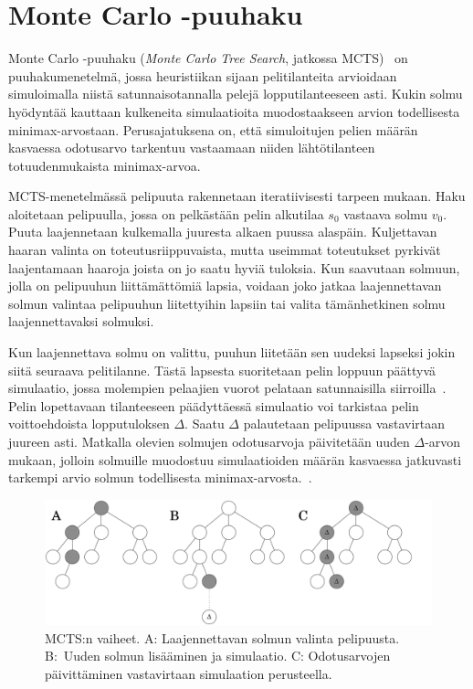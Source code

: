 \documentclass[12pt,finnish]{tktltiki2}
\theoremstyle{definition}
\theoremstyle{remark}
\begin{document}
\section{Monte Carlo -puuhaku}

Monte Carlo -puuhaku (\textit{Monte Carlo Tree Search}, jatkossa MCTS)~\cite{browne} on puuhakumenetelmä, jossa heuristiikan sijaan pelitilanteita arvioidaan simuloimalla niistä satunnaisotannalla pelejä lopputilanteeseen asti. Kukin solmu hyödyntää kauttaan kulkeneita simulaatioita muodostaakseen arvion todellisesta minimax-arvostaan. Perusajatuksena on, että simuloitujen pelien määrän kasvaessa odotusarvo tarkentuu vastaamaan niiden lähtötilanteen totuudenmukaista minimax-arvoa.

MCTS-menetelmässä pelipuuta rakennetaan iteratiivisesti tarpeen mukaan. Haku aloitetaan pelipuulla, jossa on pelkästään pelin alkutilaa $s_0$ vastaava solmu $v_0$. Puuta laajennetaan kulkemalla juuresta alkaen puussa alaspäin. Kuljettavan haaran valinta on toteutusriippuvaista, mutta useimmat toteutukset pyrkivät laajentamaan haaroja joista on jo saatu hyviä tuloksia. Kun saavutaan solmuun, jolla on pelipuuhun liittämättömiä lapsia, voidaan joko jatkaa laajennettavan solmun valintaa pelipuuhun liitettyihin lapsiin tai valita tämänhetkinen solmu laajennettavaksi solmuksi.

Kun laajennettava solmu on valittu, puuhun liitetään sen uudeksi lapseksi jokin siitä seuraava pelitilanne. Tästä lapsesta suoritetaan pelin loppuun päättyvä simulaatio, jossa molempien pelaajien vuorot pelataan satunnaisilla siirroilla~\cite{browne}. Pelin lopettavaan tilanteeseen päädyttäessä simulaatio voi tarkistaa pelin voittoehdoista lopputuloksen $\Delta$. Saatu $\Delta$ palautetaan pelipuussa vastavirtaan juureen asti. Matkalla olevien solmujen odotusarvoja päivitetään uuden $\Delta$-arvon mukaan, jolloin solmuille muodostuu simulaatioiden määrän kasvaessa jatkuvasti tarkempi arvio solmun todellisesta minimax-arvosta.~\cite{browne}.

\begin{figure}

\includegraphics[width = \textwidth]{basicmcts.png}

\caption{MCTS:n vaiheet. A: Laajennettavan solmun valinta pelipuusta. B:~Uuden solmun lisääminen ja simulaatio. C: Odotusarvojen päivittäminen vastavirtaan simulaation perusteella.}
\end{figure}
\end{document}
